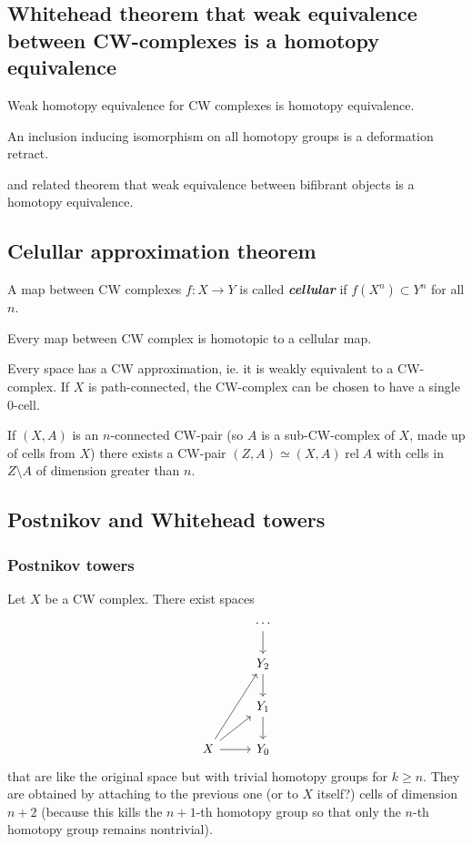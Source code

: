 \subsection{Whitehead theorem that weak equivalence between CW-complexes is a homotopy equivalence}

\begin{thm}[Whitehead]
	Weak homotopy equivalence for CW complexes is homotopy equivalence.

	An inclusion inducing isomorphism on all homotopy groups is a deformation retract.
\end{thm}


and related theorem that weak equivalence between bifibrant objects is a homotopy equivalence.
\subsection{Celullar approximation theorem}

\begin{defn}
	A map between CW complexes $f:X\to Y$ is called \textit{\textbf{cellular}} if $f(X^{n})\subset Y^{n}$ for all $n$.
\end{defn}
\begin{thm}
	Every map between CW complex is homotopic to a cellular map.
\end{thm}
\begin{thm}[CW approximation]
	Every space has a CW approximation, ie. it is weakly equivalent to a CW-complex.	
	If $X$ is path-connected, the CW-complex can be chosen to have a single 0-cell.

	If $(X,A)$ is an $n$-connected CW-pair (so $A$ is a sub-CW-complex of $X$, made up of cells from $X$) there exists a CW-pair $(Z,A)\simeq (X,A)\operatorname{rel}A$ with cells in $Z\setminus A$ of dimension greater than $n$.
\end{thm}

\subsection*{Postnikov and Whitehead towers}

\subsubsection*{Postnikov towers}
Let $X$ be a CW complex. There exist spaces
\[\begin{tikzcd}
	&\cdots\arrow[d]\\
	&Y_{2}\arrow[d]\\
	&Y_{1}\arrow[d]\\
	X\arrow[uur]\arrow[ur]\arrow[r]&Y_{0}
\end{tikzcd}\]
that are like the original space but with trivial homotopy groups for $k\geq n$. They are obtained by attaching to the previous one {\color{blue}(or to $X$ itself?)} cells of dimension $n+2$ (because this kills the $n+1$-th homotopy group so that only the $n$-th homotopy group remains nontrivial).

